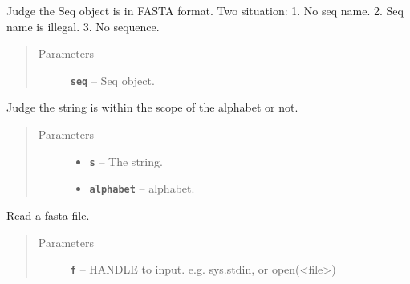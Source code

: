 \documentclass[letterpaper,10pt,english]{sphinxmanual}
\begin{document}

\begin{fulllineitems}
\label{reference/GetDNA:GetDNA.IsFasta}
Judge the Seq object is in FASTA format.
Two situation:
1. No seq name.
2. Seq name is illegal.
3. No sequence.
\begin{quote}\begin{description}
\item[{Parameters}] \leavevmode
\textbf{\texttt{seq}} -- Seq object.

\end{description}\end{quote}

\end{fulllineitems}


\begin{fulllineitems}
\label{reference/GetDNA:GetDNA.IsUnderAlphabet}
Judge the string is within the scope of the alphabet or not.
\begin{quote}\begin{description}
\item[{Parameters}] \leavevmode\begin{itemize}
\item {} 
\textbf{\texttt{s}} -- The string.

\item {} 
\textbf{\texttt{alphabet}} -- alphabet.

\end{itemize}

\end{description}\end{quote}

\end{fulllineitems}


\begin{fulllineitems}
\label{reference/GetDNA:GetDNA.ReadFasta}
Read a fasta file.
\begin{quote}\begin{description}
\item[{Parameters}] \leavevmode
\textbf{\texttt{f}} -- HANDLE to input. e.g. sys.stdin, or open(\textless{}file\textgreater{})

\end{description}\end{quote}

\end{fulllineitems}
\end{document}
